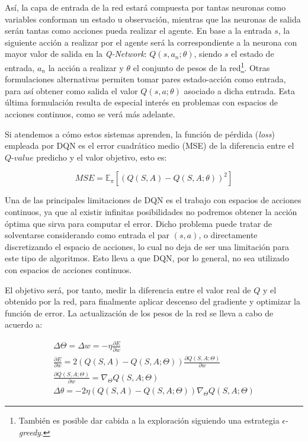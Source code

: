 Así, la capa de entrada de la red estará compuesta por tantas neuronas como variables conforman un estado u observación, mientras que las neuronas de salida serán tantas como acciones pueda realizar el agente. En base a la entrada $s$, la siguiente acción a realizar por el agente será la correspondiente a la neurona con mayor valor de salida en la \textit{Q-Network}: $Q(s,a_n;\theta)$, siendo $s$ el estado de entrada, $a_n$ la acción a realizar y $\theta$ el conjunto de pesos de la red\footnote{También es posible dar cabida a la exploración siguiendo una estrategia $\epsilon$-\textit{greedy}.}. Otras formulaciones alternativas permiten tomar pares estado-acción como entrada, para así obtener como salida el valor $Q(s,a; \theta)$ asociado a dicha entrada. Esta última formulación resulta de especial interés en problemas con espacios de acciones continuos, como se verá más adelante. 

Si atendemos a cómo estos sistemas aprenden, la función de pérdida (\textit{loss}) empleada por DQN es el error cuadrático medio (MSE) de la diferencia entre el $Q$-$value$ predicho y el valor objetivo, esto es:

\begin{equation}
    MSE = \mathds{E}_\pi[(Q(S,A) - Q(S,A;\theta))^2]
\end{equation}

Una de las principales limitaciones de DQN es el trabajo con espacios de acciones continuos, ya que al existir infinitas posibilidades no podremos obtener la acción óptima que sirva para computar el error. Dicho problema puede tratar de solventarse considerando como entrada el par $(s,a)$, o directamente discretizando el espacio de acciones, lo cual no deja de ser una limitación para este tipo de algoritmos. Esto lleva a que DQN, por lo general, no sea utilizado con espacios de acciones continuos.

El objetivo será, por tanto, medir la diferencia entre el valor real de $Q$ y el obtenido por la red, para finalmente aplicar descenso del gradiente y optimizar la función de error. La actualización de los pesos de la red se lleva a cabo de acuerdo a:
    
\begin{gather}
    \Delta \Theta = \Delta w = - \eta \frac{\partial E}{\partial w} \\
    \frac{\partial E}{\partial w} = 2(Q(S,A)-Q(S,A;\Theta)) \frac{\partial Q(S,A;\Theta)}{\partial w} \\
    \frac{\partial Q(S,A;\Theta)}{\partial w} = \nabla_\Theta Q(S,A;\Theta) \\
    \Delta \theta = -2 \eta (Q(S,A) - Q(S,A;\Theta)) \nabla_\Theta Q(S,A;\Theta)
\end{gather}


